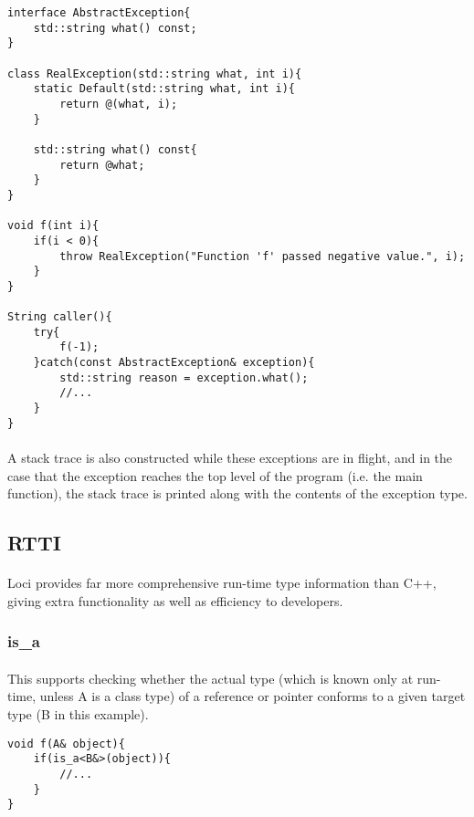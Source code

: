 \documentclass[12pt,twoside,notitlepage]{report}
\begin{document}
\begin{lstlisting}
interface AbstractException{
	std::string what() const;
}

class RealException(std::string what, int i){
	static Default(std::string what, int i){
		return @(what, i);
	}

	std::string what() const{
		return @what;
	}
}

void f(int i){
	if(i < 0){
		throw RealException("Function 'f' passed negative value.", i);
	}
}

String caller(){
	try{
		f(-1);
	}catch(const AbstractException& exception){
		std::string reason = exception.what();
		//...
	}
}
\end{lstlisting}


\paragraph{}
A stack trace is also constructed while these exceptions are in flight, and in the case that the exception reaches the top level of the program (i.e. the main function), the stack trace is printed along with the contents of the exception type.

\clearpage

\subsection{RTTI}

\paragraph{}
Loci provides far more comprehensive run-time type information than C++, giving extra functionality as well as efficiency to developers.

\subsubsection{is\_a}

\paragraph{}
This supports checking whether the actual type (which is known only at run-time, unless A is a class type) of a reference or pointer conforms to a given target type (B in this example).

\begin{lstlisting}
void f(A& object){
	if(is_a<B&>(object)){
		//...
	}
}
\end{lstlisting}
\end{document}
